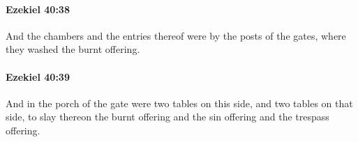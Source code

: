 		\paragraph{Ezekiel 40:38} %
			\label{EZEKIEL-40-38}

			And the chambers and the entries thereof were by the posts of the gates, where they washed the burnt offering.


		\paragraph{Ezekiel 40:39} %
			\label{EZEKIEL-40-39}

			And in the porch of the gate were two tables on this side, and two tables on that side, to slay thereon the burnt offering and the sin offering and the trespass offering.


